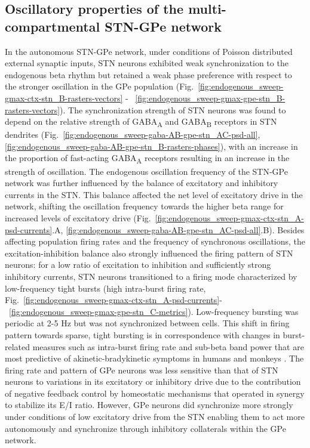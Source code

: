 \subsection{Oscillatory properties of the multi-compartmental STN-GPe network}
%
In the autonomous STN-GPe network, under conditions of Poisson distributed external synaptic inputs, STN neurons exhibited weak synchronization to the endogenous beta rhythm but retained a weak phase preference with respect to the stronger oscillation in the GPe population (Fig.~\ref{fig:endogenous_sweep-gmax-ctx-stn_B-rasters-vectors} - ~\ref{fig:endogenous_sweep-gmax-gpe-stn_B-rasters-vectors}). The synchronization strength of STN neurons was found to depend on the relative strength of GABA\textsubscript{A} and GABA\textsubscript{B} receptors in STN dendrites (Fig.~\ref{fig:endogenous_sweep-gaba-AB-gpe-stn_AC-psd-all}, \ref{fig:endogenous_sweep-gaba-AB-gpe-stn_B-rasters-phases}), with an increase in the proportion of fast-acting GABA\textsubscript{A} receptors resulting in an increase in the strength of oscillation. The endogenous oscillation frequency of the STN-GPe network was further influenced by the balance of excitatory and inhibitory currents in the STN. This balance affected the net level of excitatory drive in the network, shifting the oscillation frequency towards the higher beta range for increased levels of excitatory drive (Fig.~\ref{fig:endogenous_sweep-gmax-ctx-stn_A-psd-currents}.A, \ref{fig:endogenous_sweep-gaba-AB-gpe-stn_AC-psd-all}.B).
Besides affecting population firing rates and the frequency of synchronous oscillations, the excitation-inhibition balance also strongly influenced the firing pattern of STN neurons: for a low ratio of excitation to inhibition and sufficiently strong inhibitory currents, STN neurons transitioned to a firing mode characterized by low-frequency tight bursts (high intra-burst firing rate, Fig.~\ref{fig:endogenous_sweep-gmax-ctx-stn_A-psd-currents}-~\ref{fig:endogenous_sweep-gmax-gpe-stn_C-metrics}). Low-frequency bursting was periodic at 2-5 Hz but was not synchronized between cells. This shift in firing pattern towards sparse, tight bursting is in correspondence with changes in burst-related measures such as intra-burst firing rate and sub-beta band power that are most predictive of akinetic-bradykinetic symptoms in humans \cite{sharott_activity_2014} and monkeys \cite{sanders_parkinsonism-related_2013}. The firing rate and pattern of GPe neurons was less sensitive than that of STN neurons to variations in its excitatory or inhibitory drive due to the contribution of negative feedback control by homeostatic mechanisms that operated in synergy to stabilize its E/I ratio. However, GPe neurons did synchronize more strongly under conditions of low excitatory drive from the STN enabling them to act more autonomously and synchronize through inhibitory collaterals within the GPe network.
%
%

